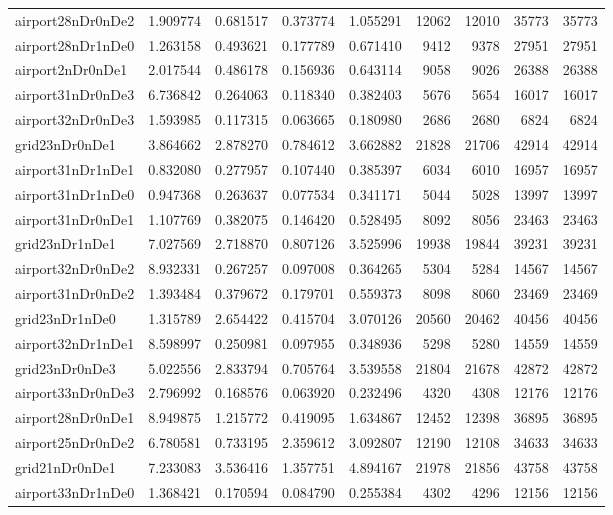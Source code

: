 \begin{longtable}{|l|r|r|r|r|r|r|r|r|}
airport28nDr0nDe2 & 1.909774 & 0.681517 & 0.373774 & 1.055291 & 12062 & 12010 & 35773 & 35773 \\
airport28nDr1nDe0 & 1.263158 & 0.493621 & 0.177789 & 0.671410 & 9412 & 9378 & 27951 & 27951 \\
airport2nDr0nDe1 & 2.017544 & 0.486178 & 0.156936 & 0.643114 & 9058 & 9026 & 26388 & 26388 \\
airport31nDr0nDe3 & 6.736842 & 0.264063 & 0.118340 & 0.382403 & 5676 & 5654 & 16017 & 16017 \\
airport32nDr0nDe3 & 1.593985 & 0.117315 & 0.063665 & 0.180980 & 2686 & 2680 & 6824 & 6824 \\
grid23nDr0nDe1 & 3.864662 & 2.878270 & 0.784612 & 3.662882 & 21828 & 21706 & 42914 & 42914 \\
airport31nDr1nDe1 & 0.832080 & 0.277957 & 0.107440 & 0.385397 & 6034 & 6010 & 16957 & 16957 \\
airport31nDr1nDe0 & 0.947368 & 0.263637 & 0.077534 & 0.341171 & 5044 & 5028 & 13997 & 13997 \\
airport31nDr0nDe1 & 1.107769 & 0.382075 & 0.146420 & 0.528495 & 8092 & 8056 & 23463 & 23463 \\
grid23nDr1nDe1 & 7.027569 & 2.718870 & 0.807126 & 3.525996 & 19938 & 19844 & 39231 & 39231 \\
airport32nDr0nDe2 & 8.932331 & 0.267257 & 0.097008 & 0.364265 & 5304 & 5284 & 14567 & 14567 \\
airport31nDr0nDe2 & 1.393484 & 0.379672 & 0.179701 & 0.559373 & 8098 & 8060 & 23469 & 23469 \\
grid23nDr1nDe0 & 1.315789 & 2.654422 & 0.415704 & 3.070126 & 20560 & 20462 & 40456 & 40456 \\
airport32nDr1nDe1 & 8.598997 & 0.250981 & 0.097955 & 0.348936 & 5298 & 5280 & 14559 & 14559 \\
grid23nDr0nDe3 & 5.022556 & 2.833794 & 0.705764 & 3.539558 & 21804 & 21678 & 42872 & 42872 \\
airport33nDr0nDe3 & 2.796992 & 0.168576 & 0.063920 & 0.232496 & 4320 & 4308 & 12176 & 12176 \\
airport28nDr0nDe1 & 8.949875 & 1.215772 & 0.419095 & 1.634867 & 12452 & 12398 & 36895 & 36895 \\
airport25nDr0nDe2 & 6.780581 & 0.733195 & 2.359612 & 3.092807 & 12190 & 12108 & 34633 & 34633 \\
grid21nDr0nDe1 & 7.233083 & 3.536416 & 1.357751 & 4.894167 & 21978 & 21856 & 43758 & 43758 \\
airport33nDr1nDe0 & 1.368421 & 0.170594 & 0.084790 & 0.255384 & 4302 & 4296 & 12156 & 12156 \\

\end{longtable}
